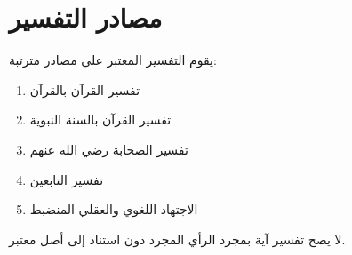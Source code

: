 
\section{مصادر التفسير}

يقوم التفسير المعتبر على مصادر مترتبة:

\begin{enumerate}
  \item تفسير القرآن بالقرآن
  \item تفسير القرآن بالسنة النبوية
  \item تفسير الصحابة رضي الله عنهم
  \item تفسير التابعين
  \item الاجتهاد اللغوي والعقلي المنضبط
\end{enumerate}

\begin{notebox}
لا يصح تفسير آية بمجرد الرأي المجرد دون استناد إلى أصل معتبر.
\end{notebox}

